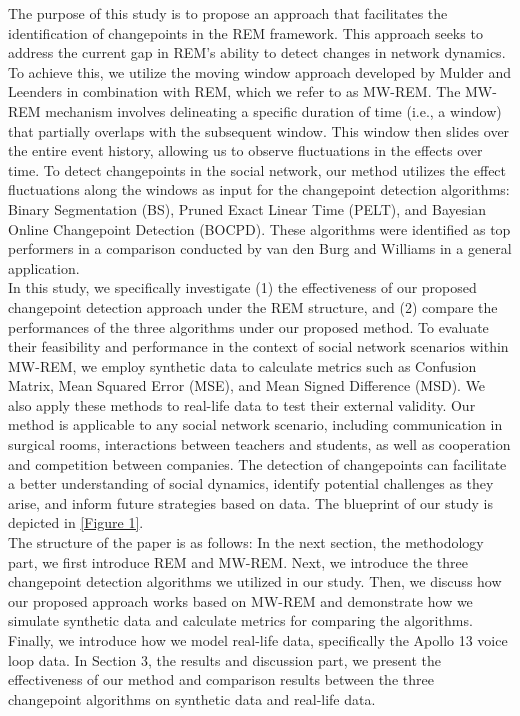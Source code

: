 \documentclass[]{interact}
\theoremstyle{plain}%
\theoremstyle{definition}
\theoremstyle{remark}
\begin{document}
{	The purpose of this study is to propose an approach that facilitates the identification of changepoints in the REM framework. This approach seeks to address the current gap in REM's ability to detect changes in network dynamics. To achieve this, we utilize the moving window approach developed by Mulder and Leenders \cite{mulderModelingEvolutionInteraction2019} in combination with REM, which we refer to as MW-REM. The MW-REM mechanism involves delineating a specific duration of time (i.e., a window) that partially overlaps with the subsequent window. This window then slides over the entire event history, allowing us to observe fluctuations in the effects over time. To detect changepoints in the social network, our method utilizes the effect fluctuations along the windows as input for the changepoint detection algorithms: Binary Segmentation (BS), Pruned Exact Linear Time (PELT), and Bayesian Online Changepoint Detection (BOCPD). These algorithms were identified as top performers in a comparison conducted by van den Burg and Williams \cite{burgEvaluationChangePoint2022} in a general application. \\
	
	In this study, we specifically investigate (1) the effectiveness of our proposed changepoint detection approach under the REM structure, and (2) compare the performances of the three algorithms under our proposed method. To evaluate their feasibility and performance in the context of social network scenarios within MW-REM, we employ synthetic data to calculate metrics such as Confusion Matrix, Mean Squared Error (MSE), and Mean Signed Difference (MSD). We also apply these methods to real-life data to test their external validity. Our method is applicable to any social network scenario, including communication in surgical rooms, interactions between teachers and students, as well as cooperation and competition between companies. The detection of changepoints can facilitate a better understanding of social dynamics, identify potential challenges as they arise, and inform future strategies based on data. The blueprint of our study is depicted in \autoref{Figure 1}. \\
	
    The structure of the paper is as follows: In the next section, the methodology part, we first introduce REM and MW-REM. Next, we introduce the three changepoint detection algorithms we utilized in our study. Then, we discuss how our proposed approach works based on MW-REM and demonstrate how we simulate synthetic data and calculate metrics for comparing the algorithms. Finally, we introduce how we model real-life data, specifically the Apollo 13 voice loop data. In Section 3, the results and discussion part, we present the effectiveness of our method and comparison results between the three changepoint algorithms on synthetic data and real-life data. \\

}
\end{document}

